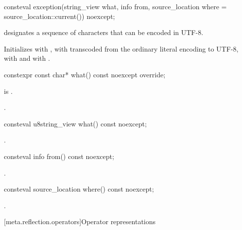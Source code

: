 %
\begin{itemdecl}
consteval exception(string_view what, info from,
                    source_location where = source_location::current()) noexcept;
\end{itemdecl}
\begin{itemdescr}
\pnum
\constantwhen
{} designates a sequence of characters
that can be encoded in UTF-8.

\pnum
\effects
Initializes
 with ,
 with 
transcoded from the ordinary literal encoding to UTF-8,
 with  and
 with .
\end{itemdescr}

%
\begin{itemdecl}
constexpr const char* what() const noexcept override;
\end{itemdecl}
\begin{itemdescr}
\pnum
\constantwhen
{} is .

\pnum
\returns
{}.
\end{itemdescr}

%
\begin{itemdecl}
consteval u8string_view what() const noexcept;
\end{itemdecl}
\begin{itemdescr}
\pnum
\returns
{}.
\end{itemdescr}

%
\begin{itemdecl}
consteval info from() const noexcept;
\end{itemdecl}
\begin{itemdescr}
\pnum
\returns
{}.
\end{itemdescr}

%
\begin{itemdecl}
consteval source_location where() const noexcept;
\end{itemdecl}
\begin{itemdescr}
\pnum
\returns
{}.
\end{itemdescr}

[meta.reflection.operators]{Operator representations}

